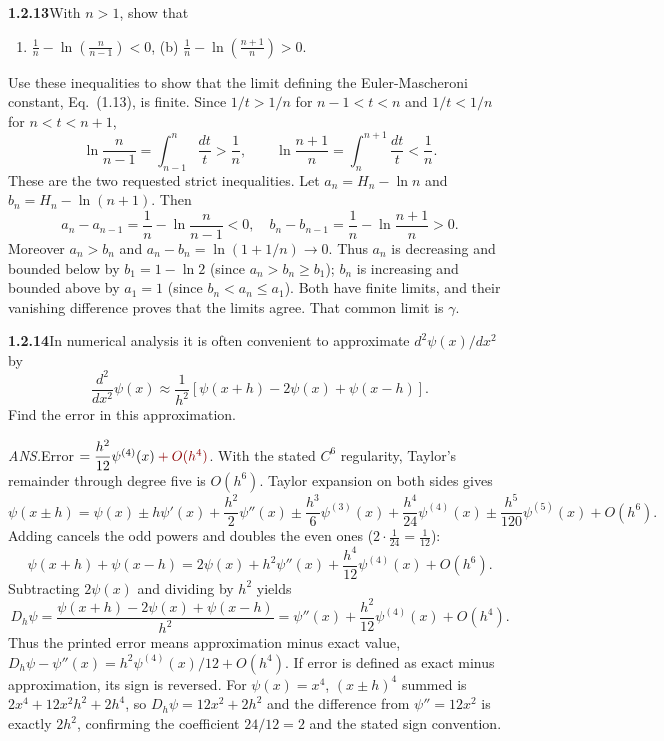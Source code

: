 \par\bigskip
\noindent\textbf{1.2.13}\quad With $n>1$, show that
\begin{enumerate}
\item[(a)] $\displaystyle\frac{1}{n}-\ln\left(\frac{n}{n-1}\right)<0$,\qquad
(b) $\displaystyle\frac{1}{n}-\ln\left(\frac{n+1}{n}\right)>0$.
\end{enumerate}
Use these inequalities to show that the limit defining the Euler-Mascheroni
constant, Eq.~(1.13), is finite.
\solution
Since $1/t>1/n$ for $n-1<t<n$ and $1/t<1/n$ for $n<t<n+1$,
\[
 \ln\frac n{n-1}=\int_{n-1}^n\frac{dt}{t}>\frac1n,
 \qquad
 \ln\frac{n+1}n=\int_n^{n+1}\frac{dt}{t}<\frac1n.
\]
These are the two requested strict inequalities.
Let $a_n=H_n-\ln n$ and $b_n=H_n-\ln(n+1)$. Then
\[
 a_n-a_{n-1}=\frac1n-\ln\frac n{n-1}<0,
 \quad
 b_n-b_{n-1}=\frac1n-\ln\frac{n+1}n>0.
\]
Moreover $a_n>b_n$ and $a_n-b_n=\ln(1+1/n)\to0$.
Thus $a_n$ is decreasing and bounded below by $b_1=1-\ln2$
(since $a_n>b_n\ge b_1$);
$b_n$ is increasing and bounded above by $a_1=1$ (since $b_n<a_n\le a_1$).
Both have finite limits, and their vanishing difference proves that
the limits agree. That common limit is $\gamma$.


\par\bigskip
\noindent\textbf{1.2.14}\quad In numerical analysis it is often convenient to
approximate $d^{2}\psi(x)/dx^{2}$ by
\[
\frac{d^{2}}{dx^{2}}\psi(x)\approx\frac{1}{h^{2}}[\psi(x+h)-2\psi(x)+\psi(x-h)].
\]
Find the error in this approximation. 
\par\nobreak\hfill\emph{ANS.}\enspace Error $=\dfrac{h^{2}}{12}\psi^{(4)}(x)\erratum{{}+O(h^4)}$. 
\solution
With the stated $C^6$ regularity, Taylor's remainder through degree five is $O(h^6)$. Taylor expansion on both
sides gives
\[
 \psi(x\pm h)=\psi(x)\pm h\psi'(x)+\frac{h^2}2\psi''(x)
 \pm\frac{h^3}6\psi^{(3)}(x)+\frac{h^4}{24}\psi^{(4)}(x)
 \pm\frac{h^5}{120}\psi^{(5)}(x)+O(h^6).
\]
Adding cancels the odd powers and doubles the even ones
($2\cdot\frac1{24}=\frac1{12}$):
\[
 \psi(x+h)+\psi(x-h)=2\psi(x)+h^2\psi''(x)+\frac{h^4}{12}\psi^{(4)}(x)
 +O(h^6).
\]
Subtracting $2\psi(x)$ and dividing by
$h^2$ yields
\[
 D_h\psi=\frac{\psi(x+h)-2\psi(x)+\psi(x-h)}{h^2}
 =\psi''(x)+\frac{h^2}{12}\psi^{(4)}(x)+O(h^4).
\]
Thus the printed error means approximation minus exact value,
$D_h\psi-\psi''(x)=h^2\psi^{(4)}(x)/12+O(h^4)$.
If error is defined as exact minus approximation, its sign is reversed.
For $\psi(x)=x^4$, $(x\pm h)^4$ summed is $2x^4+12x^2h^2+2h^4$, so
$D_h\psi=12x^2+2h^2$ and the difference from $\psi''=12x^2$ is exactly
$2h^2$, confirming the coefficient $24/12=2$ and the stated sign
convention.


